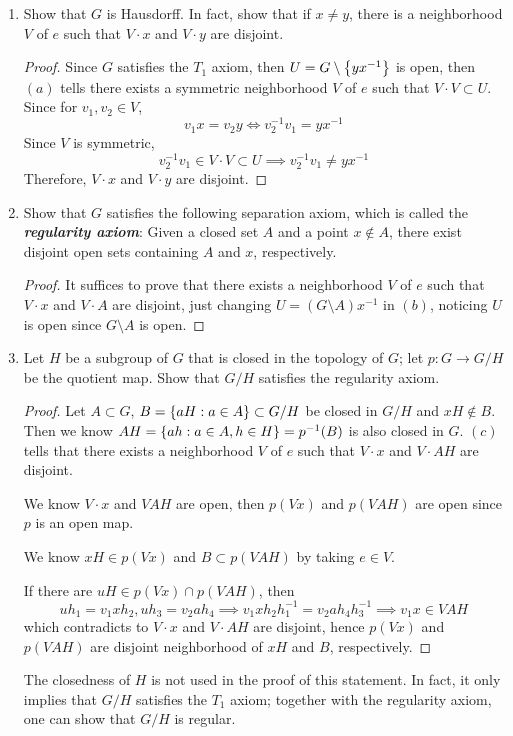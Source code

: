 \documentclass[12pt,a4paper]{article}
\begin{document}
\begin{ex}
\begin{enumerate}
            \item Show that $G$ is Hausdorff. In fact, show that if $x\neq y$, there is a neighborhood $V$ of $e$ such that $V\cdot x$ and $V\cdot y$ are disjoint.
            \begin{proof}
                Since $G$ satisfies the $T_1$ axiom, then $U=G\setminus\left\{yx^{-1}\right\}$ is open, then $(a)$ tells there exists a symmetric neighborhood $V$ of $e$ such that $V\cdot V\subset U$. Since for $v_1,v_2\in V$,
                $$
                v_1x=v_2y\iff v_2^{-1}v_1=yx^{-1}
                $$
                Since $V$ is symmetric, 
                $$
                v_2^{-1}v_1\in V\cdot V\subset U\implies v_2^{-1}v_1\neq yx^{-1}
                $$
                Therefore, $V\cdot x$ and $V\cdot y$ are disjoint.
            \end{proof}
            \item Show that $G$ satisfies the following separation axiom, which is called the \textbf{\textit{regularity axiom}}: Given a closed set $A$ and a point $x\notin A$, there exist disjoint open sets containing $A$ and $x$, respectively.
            \begin{proof}
                It suffices to prove that there exists a neighborhood $V$ of $e$ such that $V\cdot x$ and $V\cdot A$ are disjoint, just changing $U=(G\setminus A)x^{-1}$ in $(b)$, noticing $U$ is open since $G\setminus A$ is open. 
            \end{proof}
            \item Let $H$ be a subgroup of $G$ that is closed in the topology of $G$; let $p:G\to G/H$ be the quotient map. Show that $G/H$ satisfies the regularity axiom.
            \begin{proof}
                Let $A\subset G$, $B=\left\{aH:a\in A\right\}\subset G/H$ be closed in $G/H$ and $xH\notin B$. Then we know $AH=\left\{ah:a\in A,h\in H\right\}=p^{-1}(B)$ is also closed in $G$. $(c)$ tells that there exists a neighborhood $V$ of $e$ such that $V\cdot x$ and $V\cdot AH$ are disjoint.

                We know $V\cdot x$ and $VAH$ are open, then $p(Vx)$ and $p(VAH)$ are open since $p$ is an open map.

                We know $xH\in p(Vx)$ and $B\subset p(VAH)$ by taking $e\in V$.

                If there are $uH\in p(Vx)\cap p(VAH)$, then
                $$
                uh_1=v_1xh_2,uh_3=v_2ah_4\implies v_1xh_2h_1^{-1}=v_2ah_4h_3^{-1}\implies v_1x\in VAH
                $$
                which contradicts to $V\cdot x$ and $V\cdot AH$ are disjoint, hence $p(Vx)$ and $p(VAH)$ are disjoint neighborhood of $xH$ and $B$, respectively.
            \end{proof}
            \begin{remark}
                The closedness of $H$ is not used in the proof of this statement. In fact, it only implies that $G/H$ satisfies the $T_1$ axiom; together with the regularity axiom, one can show that $G/H$ is regular. 
            \end{remark}
        \end{enumerate}
    \end{ex}
\end{document}
